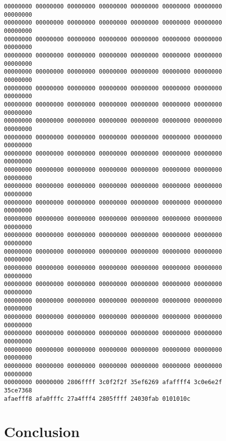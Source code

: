 \documentclass[10pt,]{book}
\begin{document}
\begin{lstlisting}
00000000 00000000 00000000 00000000 00000000 00000000 00000000 00000000
00000000 00000000 00000000 00000000 00000000 00000000 00000000 00000000
00000000 00000000 00000000 00000000 00000000 00000000 00000000 00000000
00000000 00000000 00000000 00000000 00000000 00000000 00000000 00000000
00000000 00000000 00000000 00000000 00000000 00000000 00000000 00000000
00000000 00000000 00000000 00000000 00000000 00000000 00000000 00000000
00000000 00000000 00000000 00000000 00000000 00000000 00000000 00000000
00000000 00000000 00000000 00000000 00000000 00000000 00000000 00000000
00000000 00000000 00000000 00000000 00000000 00000000 00000000 00000000
00000000 00000000 00000000 00000000 00000000 00000000 00000000 00000000
00000000 00000000 00000000 00000000 00000000 00000000 00000000 00000000
00000000 00000000 00000000 00000000 00000000 00000000 00000000 00000000
00000000 00000000 00000000 00000000 00000000 00000000 00000000 00000000
00000000 00000000 00000000 00000000 00000000 00000000 00000000 00000000
00000000 00000000 00000000 00000000 00000000 00000000 00000000 00000000
00000000 00000000 00000000 00000000 00000000 00000000 00000000 00000000
00000000 00000000 00000000 00000000 00000000 00000000 00000000 00000000
00000000 00000000 00000000 00000000 00000000 00000000 00000000 00000000
00000000 00000000 00000000 00000000 00000000 00000000 00000000 00000000
00000000 00000000 00000000 00000000 00000000 00000000 00000000 00000000
00000000 00000000 00000000 00000000 00000000 00000000 00000000 00000000
00000000 00000000 00000000 00000000 00000000 00000000 00000000 00000000
00000000 00000000 00000000 00000000 00000000 00000000 00000000 00000000
00000000 00000000 2806ffff 3c0f2f2f 35ef6269 afaffff4 3c0e6e2f 35ce7368
afaefff8 afa0fffc 27a4fff4 2805ffff 24030fab 0101010c 
\end{lstlisting}
\chapter{Conclusion}

\appendix

\printbibliography[title=Bibliography]
\end{document}
